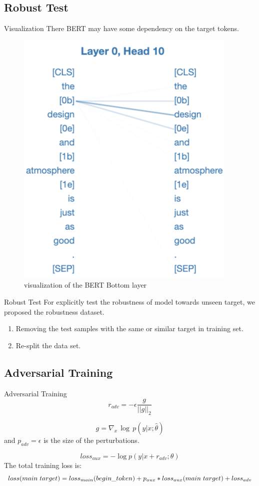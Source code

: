 \documentclass[xcolor=dvipsnames]{beamer}
\begin{document}
\subsection{Robust Test}
\begin{frame}{Visualization}
  There BERT may have some dependency on the target tokens.
  \begin{figure}[h]
    \centering
    \includegraphics[width=0.3\linewidth]{./image/target-depence.png}
    \caption{visualization of the BERT Bottom layer }
  \label{target-depence}
\end{figure}
\end{frame}

\begin{frame}{Robust Test}
For explicitly test the robustness of model towards unseen target, we proposed the robustness dataset.
\begin{enumerate}
  \item Removing the test samples with the same or similar target in training set.
  \item Re-split the data set.
\end{enumerate}


\end{frame}


\subsection{Adversarial Training}
\begin{frame}{Adversarial Training}
\begin{equation}
r_{adv} = -\epsilon \frac{g}{||g||_2}
\end{equation} 

\begin{equation}
    g = \nabla_{x}\, \log\,  p(y|x;\hat{\theta})
\end{equation} and $p_{adv}=\epsilon$ is the size of the perturbations.

\begin{equation}
	loss_{aux}=- \log p(y|x + r_{adv};\theta)
\end{equation}
The total training loss is:  
\begin{equation}
  \small
    loss(main\ target)=loss_{main}(begin\_{token})+p_{aux}*loss_{aux}(main\ target)+loss_{adv}
\end{equation}

\end{frame}
\end{document}
